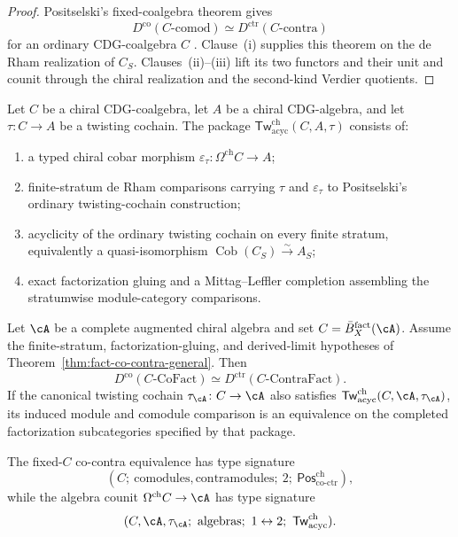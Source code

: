 \begin{proof}
Positselski's fixed-coalgebra theorem gives
\[
 D^{\mathrm{co}}(C\text{-}\mathrm{comod})
 \simeq
 D^{\mathrm{ctr}}(C\text{-}\mathrm{contra})
\]
for an ordinary CDG-coalgebra \(C\)
\cite[Theorem~5.2]{Positselski11}.  Clause~\textup{(i)} supplies this
theorem on the de Rham realization of \(C_S\).
Clauses~\textup{(ii)}--\textup{(iii)} lift its two functors and their
unit and counit through the chiral realization and the second-kind
Verdier quotients.
\end{proof}

\begin{definition}
\label{def:acyclic-chiral-twisting-comparison}
Let \(C\) be a chiral CDG-coalgebra, let \(A\) be a chiral
CDG-algebra, and let \(\tau\colon C\to A\) be a twisting cochain.
The package
\(\mathsf{Tw}^{\mathrm{ch}}_{\mathrm{acyc}}(C,A,\tau)\)
consists of:
\begin{enumerate}[label=\textup{(\roman*)}]
\item a typed chiral cobar morphism
 \(\varepsilon_\tau\colon\Omega^{\mathrm{ch}}C\to A\);
\item finite-stratum de Rham comparisons carrying \(\tau\) and
 \(\varepsilon_\tau\) to Positselski's ordinary twisting-cochain
 construction;
\item acyclicity of the ordinary twisting cochain on every finite
 stratum, equivalently a quasi-isomorphism
 \(\operatorname{Cob}(C_S)\xrightarrow{\sim}A_S\);
\item exact factorization gluing and a Mittag--Leffler completion
 assembling the stratumwise module-category comparisons.
\end{enumerate}
\end{definition}

\begin{theorem}
\label{thm:off-koszul-ran-inversion}
Let \(\cA\) be a complete augmented chiral algebra and set
\(C=\bar B_X^{\mathrm{fact}}(\cA)\).  Assume the finite-stratum,
factorization-gluing, and derived-limit hypotheses of
Theorem~\ref{thm:fact-co-contra-general}.  Then
\[
 D^{\mathrm{co}}(C\text{-}\mathrm{CoFact})
 \simeq
 D^{\mathrm{ctr}}(C\text{-}\mathrm{ContraFact}).
\]
If the canonical twisting cochain
\(\tau_{\cA}\colon C\to\cA\) also satisfies
\(\mathsf{Tw}^{\mathrm{ch}}_{\mathrm{acyc}}
(C,\cA,\tau_{\cA})\), its induced module and comodule comparison is an
equivalence on the completed factorization subcategories specified by
that package.

The fixed-\(C\) co-contra equivalence has type signature
\[
(C;\ \mathrm{comodules},\mathrm{contramodules};\ 2;\
\mathsf{Pos}^{\mathrm{ch}}_{\mathrm{co\text{-}ctr}}),
\]
while the algebra counit
\(\Omega^{\mathrm{ch}}C\to\cA\) has type signature
\[
(C,\cA,\tau_{\cA};\ \mathrm{algebras};\ 1\leftrightarrow2;\
\mathsf{Tw}^{\mathrm{ch}}_{\mathrm{acyc}}).
\]
\end{theorem}

